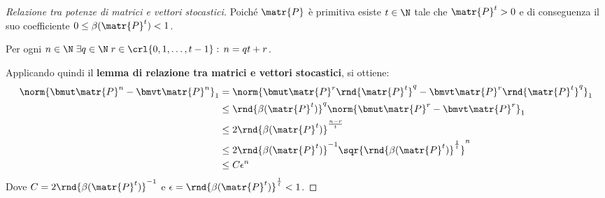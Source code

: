 \documentclass[\main/main.tex]{subfiles}
\begin{document}
\begin{proof}[Relazione tra potenze di matrici e vettori stocastici]
  Poiché \(\matr{P}\) è primitiva esiste \(t \in \N \) tale che \(\matr{P}^t > 0\) e di conseguenza il suo coefficiente \(0\leq\beta(\matr{P}^t)<1\).

  Per ogni \(n \in \N \; \exists q \in \N\; r \in \crl{0, 1, \ldots, t-1}: \, n = qt + r\).

  Applicando quindi il \textbf{lemma di relazione tra matrici e vettori stocastici}, si ottiene:
  \begin{align*}
    \norm{\bmut \matr{P}^n - \bmvt \matr{P}^n}_1 & = \norm{\bmut \matr{P}^r\rnd{\matr{P}^t}^q - \bmvt\matr{P}^r\rnd{\matr{P}^t}^q}_1 \\
                                                 & \leq \rnd{\beta(\matr{P}^t)}^q \norm{\bmut \matr{P}^r - \bmvt \matr{P}^r}_1       \\
                                                 & \leq 2\rnd{\beta(\matr{P}^t)}^{\frac{n-r}{t}}                                     \\
                                                 & \leq 2\rnd{\beta(\matr{P}^t)}^{-1} \sqr{\rnd{\beta(\matr{P}^t)}^{\frac{1}{t}}}^n  \\
                                                 & \leq C\epsilon^n                                                                  \\
  \end{align*}
  Dove \(C = 2\rnd{\beta(\matr{P}^t)}^{-1}\) e \(\epsilon = \rnd{\beta(\matr{P}^t)}^{\frac{1}{t}} <1\).
\end{proof}
\end{document}
